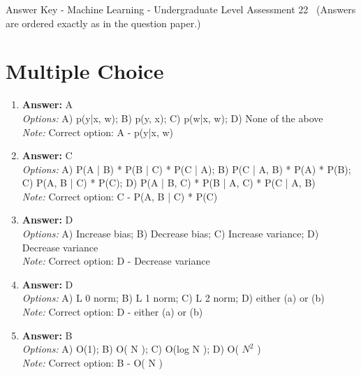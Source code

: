 \documentclass[12pt]{article}
\begin{document}
\begin{center}
Answer Key - Machine Learning - Undergraduate Level Assessment 22 \
\small (Answers are ordered exactly as in the question paper.)
\end{center}

\section*{Multiple Choice}
\begin{enumerate}[label=\arabic*.]
\item \textbf{Answer:} A
\\ \textit{Options:} A) p(y|x, w); B) p(y, x); C) p(w|x, w); D) None of the above
\\ \textit{Note:} Correct option: A - p(y|x, w)
\item \textbf{Answer:} C
\\ \textit{Options:} A) P(A | B) * P(B | C) * P(C | A); B) P(C | A, B) * P(A) * P(B); C) P(A, B | C) * P(C); D) P(A | B, C) * P(B | A, C) * P(C | A, B)
\\ \textit{Note:} Correct option: C - P(A, B | C) * P(C)
\item \textbf{Answer:} D
\\ \textit{Options:} A) Increase bias; B) Decrease bias; C) Increase variance; D) Decrease variance
\\ \textit{Note:} Correct option: D - Decrease variance
\item \textbf{Answer:} D
\\ \textit{Options:} A) L 0 norm; B) L 1 norm; C) L 2 norm; D) either (a) or (b)
\\ \textit{Note:} Correct option: D - either (a) or (b)
\item \textbf{Answer:} B
\\ \textit{Options:} A) O(1); B) O( N ); C) O(log N ); D) O( $N^2$ )
\\ \textit{Note:} Correct option: B - O( N )
\end{enumerate}
\end{document}
